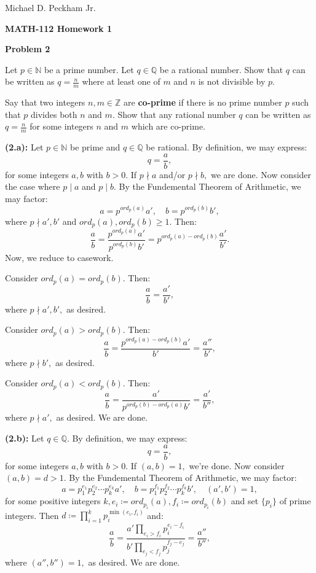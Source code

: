 \documentclass[11pt,letterpaper]{article}
\begin{document}
Michael D. Peckham Jr.

\begin{center}
\textbf{{\Large MATH-112 Homework 1}}\medskip
\end{center}

\begin{mdframed}[style=MyFrame]
\textbf{Problem 2}

    \item Let $p\in \mathbb{N}$ be a prime number. Let $q\in\mathbb{Q}$ be a
    rational number. Show
    that $q$ can be written as $q=\frac{n}{m}$ where at least one of $m$ and $n$ is not
    divisible by $p$.
    \item Say that two integers $n,m\in\mathbb{Z}$ are \textbf{co-prime} if there
    is no
    prime number $p$ such that $p$ divides both $n$ and $m$.
    Show that any rational number $q$ can be written as $q=\frac{n}{m}$ for some
    integers $n$ and $m$ which are co-prime.
\denuma
\end{mdframed}

\textbf{(2.a):} Let $p\in \mathbb{N}$ be prime and $q\in \mathbb{Q}$ be rational.
By definition, we may express:
\[
    q = \frac{a}{b},
\] for some integers $a,b$ with $b>0.$
If $p\nmid a$ and/or $p\nmid b,$ we are done.
Now consider the case where $p\mid a$ and $p\mid b.$
By the Fundemental Theorem of Arithmetic, we may factor:
\[
    a = p^{ord_p(a)} a',\quad b = p^{ord_p(b)} b',
\] where $p\nmid a',b'$ and $ord_p(a),ord_p(b)\geq 1.$
Then:
\[ 
    \frac{a}{b} 
        = \frac{p^{ord_p(a)} a'}{p^{ord_p(b)} b'} 
        = p^{ord_p(a) - ord_p(b)} \frac{a'}{b'}.
\]
Now, we reduce to casework.
    \item Consider $ord_p(a) = ord_p(b).$ Then:
        \[
            \frac{a}{b} = \frac{a'}{b'}, 
        \] where $p\nmid a',b',$ as desired.
    \item Consider $ord_p(a) > ord_p(b).$ Then:
        \[
            \frac{a}{b} = \frac{p^{ord_p(a) - ord_p(b)} a'}{b'} = \frac{a''}{b'},
        \] where $p\nmid b',$ as desired.
    \item Consider $ord_p(a) < ord_p(b).$ Then:
        \[
            \frac{a}{b} = \frac{a'}{p^{ord_p(b)-ord_p(a)} b'} = \frac{a'}{b''},
        \] where $p\nmid a',$ as desired.
\denumi
We are done.\\
\rightline{$\square$}

\textbf{(2.b):} Let $q\in \mathbb{Q}.$ By definition, we may express:
\[
    q = \frac{a}{b},
\] for some integers $a,b$ with $b>0.$
If $(a,b) = 1,$ we're done.
Now consider $(a,b) = d > 1.$
By the Fundemental Theorem of Arithmetic, we may factor:
\[
    a = p_1^{e_1} p_2^{e_2} \cdots p_k^{e_k} a',\quad b = p_1^{f_1} p_2^{f_2}\cdots p_k^{f_k} b',\quad (a',b')=1,
\] for some positive integers $k,e_i\coloneqq ord_{p_i}(a),f_i\coloneqq ord_{p_i}(b)$ and set $\{p_i\}$ of prime integers.
Then $d \coloneqq \prod_{i=1}^k p_i^{\min(e_i,f_i)}$ and:
\[
    \frac{a}{b} = \frac{a' \prod_{e_i > f_i} p_i^{e_i - f_i}}{b' \prod_{e_j < f_j} p_j^{f_j - e_j}} = \frac{a''}{b''},
\] where $(a'',b'') = 1,$ as desired.
We are done.\\
\rightline{$\square$}
\end{document}

